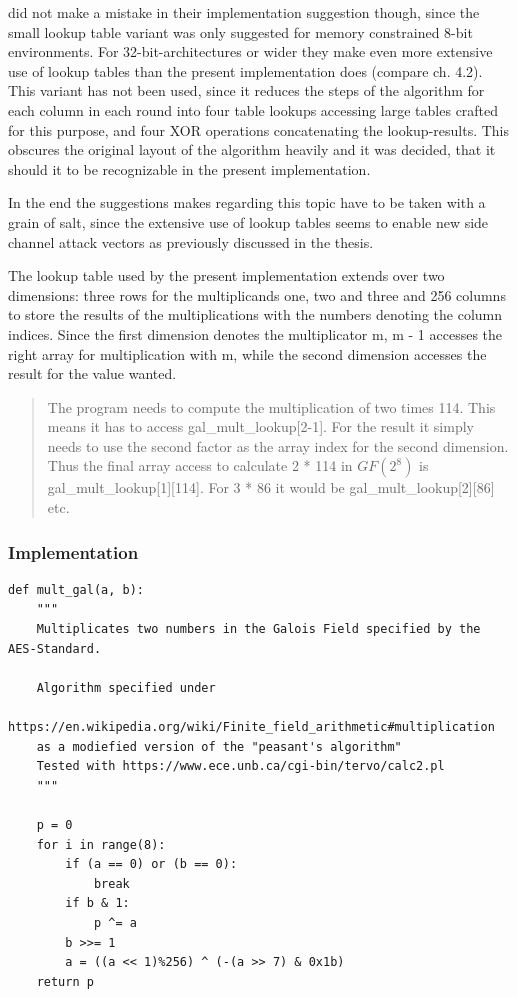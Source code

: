 \cite{rijndael} did not
make a mistake in their implementation suggestion though, since the
small lookup table variant was only suggested for memory constrained
8-bit environments. For 32-bit-architectures or wider they make even more
extensive use of lookup tables than the present implementation does
(compare ch. 4.2). This variant has not been used, since it reduces the
steps of the algorithm for each column in each round into four table
lookups accessing large tables crafted for this purpose, and four XOR
operations concatenating the lookup-results. This obscures the original
layout of the algorithm heavily and it was decided, that it should it to be recognizable
in the present implementation.

In the end the suggestions \cite{rijndael} makes regarding this topic have to
be taken with a grain of salt, since the extensive use of lookup tables
seems to enable new side channel attack vectors as previously discussed in the thesis.

The lookup table used by the present implementation extends over two
dimensions: three rows for the multiplicands one, two and three and 256
columns to store the results of the multiplications with the numbers
denoting the column indices. Since the first dimension denotes the
multiplicator m, m - 1 accesses the right array for multiplication with
m, while the second dimension accesses the result for the value wanted.

\begin{quote}
The program needs to compute the multiplication of two times 114. This
means it has to access gal\_mult\_lookup[2-1]. For the result it
simply needs to use the second factor as the array index for the second
dimension. Thus the final array access to calculate 2 * 114 in $GF(2^{8})$ is
gal\_mult\_lookup[1][114]. For 3 * 86 it would be
gal\_mult\_lookup[2][86] etc.
\end{quote}

\hypertarget{implementation}{%
\subsubsection{Implementation}\label{implementation}}

\begin{lstlisting}
def mult_gal(a, b):
    """
    Multiplicates two numbers in the Galois Field specified by the AES-Standard.

    Algorithm specified under
    https://en.wikipedia.org/wiki/Finite_field_arithmetic#multiplication
    as a modiefied version of the "peasant's algorithm"
    Tested with https://www.ece.unb.ca/cgi-bin/tervo/calc2.pl
    """

    p = 0
    for i in range(8):
        if (a == 0) or (b == 0):
            break
        if b & 1:
            p ^= a
        b >>= 1
        a = ((a << 1)%256) ^ (-(a >> 7) & 0x1b)
    return p
\end{lstlisting}


